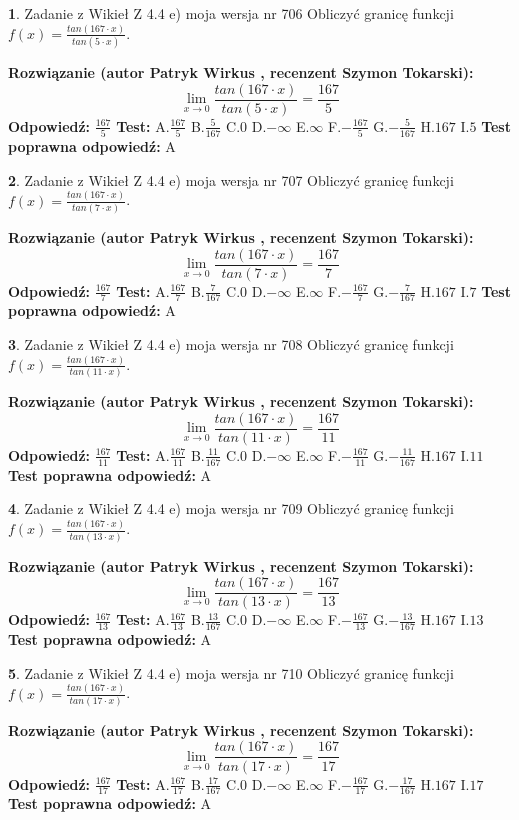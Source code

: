 \documentclass[12pt, a4paper]{article}
\theoremstyle{definition} %
\newtheorem{zad}{}
\newcommand{\zadStart}[1]{\begin{zad}#1\newline}
\newcommand{\zadStop}{\end{zad}}
\newcommand{\rozwStart}[2]{\noindent \textbf{Rozwiązanie (autor #1 , recenzent #2): }\newline}
\newcommand{\rozwStop}{\newline}
\newcommand{\odpStart}{\noindent \textbf{Odpowiedź:}\newline}
\newcommand{\odpStop}{\newline}
\newcommand{\testStart}{\noindent \textbf{Test:}\newline}
\newcommand{\testStop}{\newline}
\newcommand{\kluczStart}{\noindent \textbf{Test poprawna odpowiedź:}\newline}
\newcommand{\kluczStop}{\newline}
\begin{document}
\zadStart{Zadanie z Wikieł Z 4.4 e) moja wersja nr 706}
Obliczyć granicę funkcji $f(x)=\frac{tan(167\cdot x)}{tan(5\cdot x)}$.
\zadStop
\rozwStart{Patryk Wirkus}{Szymon Tokarski}
$$\lim\limits_{x\to 0}\frac{tan(167\cdot x)}{tan(5\cdot x)}=
\frac{167}{5}$$
\rozwStop
\odpStart
$\frac{167}{5}$
\odpStop
\testStart
A.$\frac{167}{5}$
B.$\frac{5}{167}$
C.$0$
D.$-\infty$
E.$\infty$
F.$-\frac{167}{5}$
G.$-\frac{5}{167}$
H.$167$
I.$5$
\testStop
\kluczStart
A
\kluczStop



\zadStart{Zadanie z Wikieł Z 4.4 e) moja wersja nr 707}
Obliczyć granicę funkcji $f(x)=\frac{tan(167\cdot x)}{tan(7\cdot x)}$.
\zadStop
\rozwStart{Patryk Wirkus}{Szymon Tokarski}
$$\lim\limits_{x\to 0}\frac{tan(167\cdot x)}{tan(7\cdot x)}=
\frac{167}{7}$$
\rozwStop
\odpStart
$\frac{167}{7}$
\odpStop
\testStart
A.$\frac{167}{7}$
B.$\frac{7}{167}$
C.$0$
D.$-\infty$
E.$\infty$
F.$-\frac{167}{7}$
G.$-\frac{7}{167}$
H.$167$
I.$7$
\testStop
\kluczStart
A
\kluczStop



\zadStart{Zadanie z Wikieł Z 4.4 e) moja wersja nr 708}
Obliczyć granicę funkcji $f(x)=\frac{tan(167\cdot x)}{tan(11\cdot x)}$.
\zadStop
\rozwStart{Patryk Wirkus}{Szymon Tokarski}
$$\lim\limits_{x\to 0}\frac{tan(167\cdot x)}{tan(11\cdot x)}=
\frac{167}{11}$$
\rozwStop
\odpStart
$\frac{167}{11}$
\odpStop
\testStart
A.$\frac{167}{11}$
B.$\frac{11}{167}$
C.$0$
D.$-\infty$
E.$\infty$
F.$-\frac{167}{11}$
G.$-\frac{11}{167}$
H.$167$
I.$11$
\testStop
\kluczStart
A
\kluczStop



\zadStart{Zadanie z Wikieł Z 4.4 e) moja wersja nr 709}
Obliczyć granicę funkcji $f(x)=\frac{tan(167\cdot x)}{tan(13\cdot x)}$.
\zadStop
\rozwStart{Patryk Wirkus}{Szymon Tokarski}
$$\lim\limits_{x\to 0}\frac{tan(167\cdot x)}{tan(13\cdot x)}=
\frac{167}{13}$$
\rozwStop
\odpStart
$\frac{167}{13}$
\odpStop
\testStart
A.$\frac{167}{13}$
B.$\frac{13}{167}$
C.$0$
D.$-\infty$
E.$\infty$
F.$-\frac{167}{13}$
G.$-\frac{13}{167}$
H.$167$
I.$13$
\testStop
\kluczStart
A
\kluczStop



\zadStart{Zadanie z Wikieł Z 4.4 e) moja wersja nr 710}
Obliczyć granicę funkcji $f(x)=\frac{tan(167\cdot x)}{tan(17\cdot x)}$.
\zadStop
\rozwStart{Patryk Wirkus}{Szymon Tokarski}
$$\lim\limits_{x\to 0}\frac{tan(167\cdot x)}{tan(17\cdot x)}=
\frac{167}{17}$$
\rozwStop
\odpStart
$\frac{167}{17}$
\odpStop
\testStart
A.$\frac{167}{17}$
B.$\frac{17}{167}$
C.$0$
D.$-\infty$
E.$\infty$
F.$-\frac{167}{17}$
G.$-\frac{17}{167}$
H.$167$
I.$17$
\testStop
\kluczStart
A
\kluczStop
\end{document}
